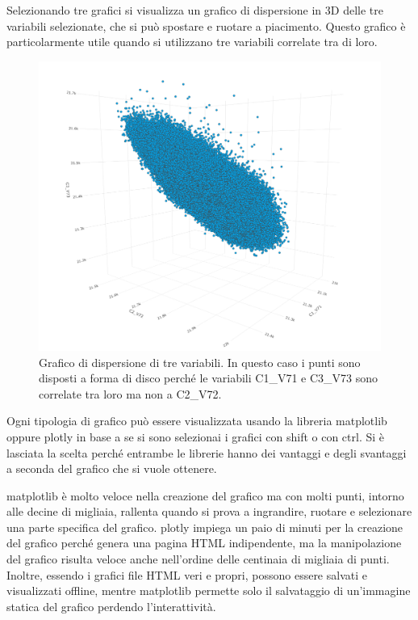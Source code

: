 Selezionando tre grafici si visualizza un grafico di dispersione in 3D delle tre variabili selezionate, che si può spostare e ruotare a piacimento. Questo grafico è particolarmente utile quando si utilizzano tre variabili correlate tra di loro.

\begin{figure}[H]
	\includegraphics[width=\textwidth]{figures/3Dscatter}
	\caption[Grafico di dispersione di tre variabili]{ Grafico di dispersione di tre variabili. In questo caso i punti sono disposti a forma di disco perché le variabili C1\_V71 e C3\_V73 sono correlate tra loro ma non a C2\_V72.
		\label{fig:3Dscatter}}
\end{figure}

Ogni tipologia di grafico può essere visualizzata usando la libreria matplotlib\cite{matplotlib} oppure plotly\cite{plotly} in base a se si sono selezionai i grafici con shift o con ctrl. Si è lasciata la scelta perché entrambe le librerie hanno dei vantaggi e degli svantaggi a seconda del grafico che si vuole ottenere.

matplotlib è molto veloce nella creazione del grafico ma con molti punti, intorno alle decine di migliaia, rallenta quando si prova a ingrandire, ruotare e selezionare una parte specifica del grafico.
plotly impiega un paio di minuti per la creazione del grafico perché genera una pagina HTML indipendente, ma la manipolazione del grafico risulta veloce anche nell'ordine delle centinaia di migliaia di punti. Inoltre, essendo i grafici file HTML veri e propri, possono essere salvati e visualizzati offline, mentre matplotlib permette solo il salvataggio di un'immagine statica del grafico perdendo l'interattività.

